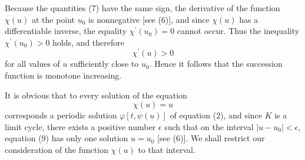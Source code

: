 \documentclass[10pt,a5paper]{book}
\makeatletter
\theoremstyle{plain}
\theoremstyle{definition}
\theoremstyle{remark}
\renewenvironment{proof}[1][\proofname]{\par
  \pushQED{\qed}%
  \normalfont\topsep6\p@\@plus6\p@\relax
  \trivlist
  \item\relax{\itshape #1\@addpunct{.}}\hspace\labelsep\ignorespaces
}{\popQED\endtrivlist\@endpefalse}
\makeatother
\begin{document}
\begin{proof}
Because the quantities (7) have the same sign, the derivative of the function $\chi(u)$ at the point $u_{0}$ is nonnegative [see (6)], and since $\chi(u)$ has a differentiable inverse, the equality $\chi^{\prime}\left(u_{0}\right)=0$ cannot occur. Thus the inequality $\chi^{\prime}\left(u_{0}\right)>0$ holds, and therefore
\[
\chi^{\prime}(u)>0
\]
for all values of $u$ sufficiently close to $u_{0}$. Hence it follows that the succession function is monotone increasing.

It is obvious that to every solution of the equation
\begin{equation*}
\chi(u)=u \tag{9}
\end{equation*}
corresponds a periodic solution $\varphi[t, \psi(u)]$ of equation (2), and since $K$ is a limit cycle, there exists a positive number $\epsilon$ such that on the interval $\left|u-u_{0}\right|<\epsilon$, equation (9) has only one solution $u=u_{0}$ [see (6)]. We shall restrict our consideration of the function $\chi(u)$ to that interval.


\end{proof}
\end{document}
